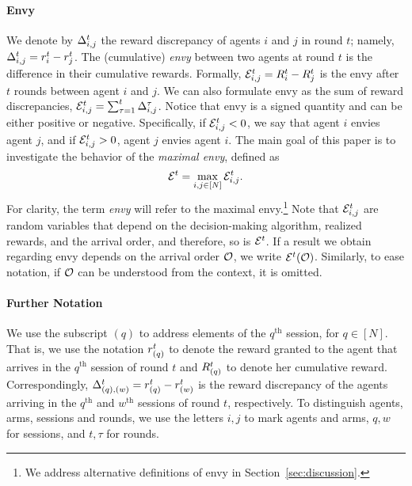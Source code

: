 \paragraph{Envy}
We denote by $\Delta^t_{i,j}$ the reward discrepancy of agents $i$ and $j$ in round $t$; namely, $\Delta^t_{i,j}= r_{i}^t - r_{j}^t$. %
The (cumulative) \emph{envy} between two agents at round $t$ is the difference in their cumulative rewards. Formally, $\mathcal{E}_{i,j}^t= R_{i}^t - R_{j}^t$ is the envy after $t$ rounds between agent $i$ and $j$. We can also formulate envy as the sum of reward discrepancies, $\mathcal{E}_{i,j}^t= \sum^{t}_{\tau=1}{\Delta_{i,j}^\tau}$. Notice that envy is a signed quantity and can be either positive or negative. Specifically, if $\mathcal{E}_{i,j}^t < 0$, we say that agent $i$ envies agent $j$, and if $\mathcal{E}_{i,j}^t > 0$, agent $j$ envies agent $i$. The main goal of this paper is to investigate the behavior of the \emph{maximal envy}, defined as
\[
\mathcal{E}^t = \max_{i,j \in [N]} \mathcal{E}^t_{i,j}.
\]
For clarity, the term \emph{envy} will refer to the maximal envy.\footnote{ We address alternative definitions of envy in Section~\ref{sec:discussion}.} %
Note that $\mathcal{E}_{i,j}^t$ are random variables that depend on the decision-making algorithm, realized rewards, and the arrival order, and therefore, so is $\mathcal{E}^t$. If a result we obtain regarding envy depends on the arrival order $\mathcal O$, we write $\mathcal{E}^t(\mathcal O)$. Similarly, to ease notation, if $\mathcal O$ can be understood from the context, it is omitted.



\paragraph{Further Notation} We use the subscript $(q)$ to address elements of the $q^{\text{th}}$ session, for $q\in [N]$.
That is, we use the notation $r_{(q)}^t$ to denote the reward granted to the agent that arrives in the $q^{\text{th}}$ session of round $t$ and $R_{(q)}^t$ to denote her cumulative reward. %
Correspondingly, $\Delta^t_{\left(q\right),\left(w\right)} = r_{(q)}^t - r_{(w)}^t$ is the reward discrepancy of the agents arriving in the $q^{\text{th}}$ and $w^{\text{th}}$ sessions of round $t$, respectively. 
To distinguish agents, arms, sessions and rounds, we use the letters $i,j$ to mark agents and arms, $q,w$ for sessions, and $t,\tau$ for rounds.



